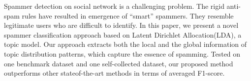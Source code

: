 Spammer detection on social network is a challenging problem. The rigid anti-spam rules have resulted in emergence of ``smart'' spammers. They resemble legitimate users who are difficult to identify. In this paper, we present a novel spammer classification approach based on Latent Dirichlet Allocation(LDA), a topic model. Our approach extracts both the local and the global information of topic distribution patterns, which capture the essence of spamming. Tested on one benchmark dataset and one self-collected dataset, our proposed method outperforms other stateof-the-art methods in terms of averaged F1-score.
